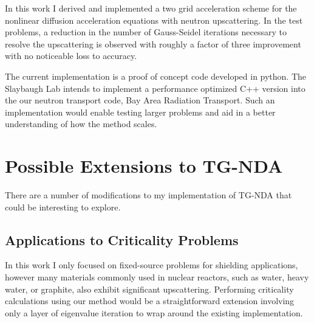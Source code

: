
In this work I derived and implemented a two grid acceleration scheme for the nonlinear diffusion acceleration equations with neutron upscattering. In the test problems, a reduction in the number of Gauss-Seidel iterations necessary to resolve the upscattering is observed with roughly a factor of three improvement with no noticeable loss to accuracy. 

The current implementation is a proof of concept code developed in python. The Slaybaugh Lab intends to implement a performance optimized C++ version into the our neutron transport code, Bay Area Radiation Transport. Such an implementation would enable testing larger problems and aid in a better understanding of how the method scales.

\section{Possible Extensions to TG-NDA}
There are a number of modifications to my implementation of TG-NDA that could be interesting to explore. 


\subsection{Applications to Criticality Problems}
In this work I only focused on fixed-source problems for shielding applications, however many materials commonly used in nuclear reactors, such as water, heavy water, or graphite, also exhibit significant upscattering. Performing criticality calculations using our method would be a straightforward extension involving only a layer of eigenvalue iteration to wrap around the existing implementation. 



